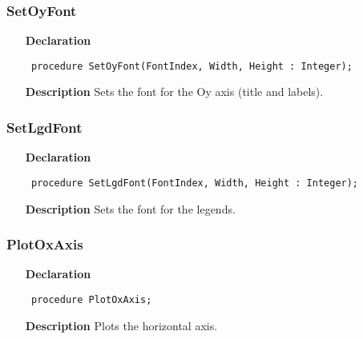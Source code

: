 \documentclass[12pt,a4paper,oneside]{report}
\newcommand{\declarationitem}[1]{\textbf{#1}}
\newcommand{\descriptiontitle}[1]{\textbf{#1}}
\newcommand{\code}[1]{\texttt{#1}}
\begin{document}
\subsubsection{SetOyFont}
\label{uplot-SetOyFont}
\begin{itemize}\item[\declarationitem{Declaration}\hfill]
	\begin{flushleft}
		\code{
			procedure SetOyFont(FontIndex, Width, Height : Integer);}
		
	\end{flushleft}
	
	\par
	\item[\descriptiontitle{Description}]
	Sets the font for the Oy axis (title and labels).
	
\end{itemize}
\subsubsection{SetLgdFont}
\label{uplot-SetLgdFont}
\begin{itemize}\item[\declarationitem{Declaration}\hfill]
	\begin{flushleft}
		\code{
			procedure SetLgdFont(FontIndex, Width, Height : Integer);}
		
	\end{flushleft}
	
	\par
	\item[\descriptiontitle{Description}]
	Sets the font for the legends.
	
\end{itemize}
\subsubsection{PlotOxAxis}
\label{uplot-PlotOxAxis}
\begin{itemize}\item[\declarationitem{Declaration}\hfill]
	\begin{flushleft}
		\code{
			procedure PlotOxAxis;}
		
	\end{flushleft}
	
	\par
	\item[\descriptiontitle{Description}]
	Plots the horizontal axis.
	
\end{itemize}
\end{document}

